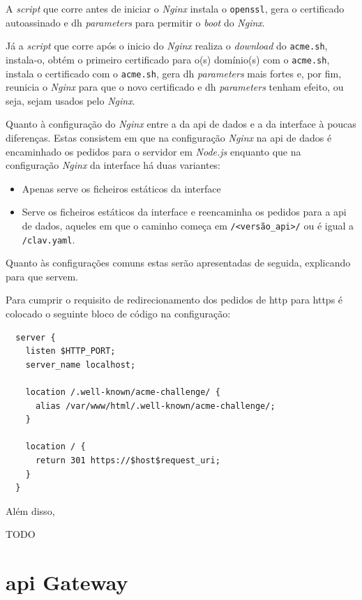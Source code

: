 A \textit{script} que corre antes de iniciar o \textit{Nginx} instala o \texttt{openssl}, gera o certificado autoassinado e \acrshort{dh} \textit{parameters} para permitir o \textit{boot} do \textit{Nginx}.

Já a \textit{script} que corre após o inicio do \textit{Nginx} realiza o \textit{download} do \texttt{acme.sh}, instala-o, obtém o primeiro certificado para o(s) domínio(s) com o \texttt{acme.sh}, instala o certificado com o \texttt{acme.sh}, gera \acrshort{dh} \textit{parameters} mais fortes e, por fim, reunicia o \textit{Nginx} para que o novo certificado e \acrshort{dh} \textit{parameters} tenham efeito, ou seja, sejam usados pelo \textit{Nginx}.

Quanto à configuração do \textit{Nginx} entre a da \acrshort{api} de dados e a da interface à poucas diferenças. Estas consistem em que na configuração \textit{Nginx} na \acrshort{api} de dados é encaminhado os pedidos para o servidor em \textit{Node.js} enquanto que na configuração \textit{Nginx} da interface há duas variantes:
\begin{itemize}
    \item Apenas serve os ficheiros estáticos da interface
    \item Serve os ficheiros estáticos da interface e reencaminha os pedidos para a \acrshort{api} de dados, aqueles em que o caminho começa em \texttt{/<versão\_api>/} ou é igual a \texttt{/clav.yaml}.
\end{itemize}

Quanto às configurações comuns estas serão apresentadas de seguida, explicando para que servem.

Para cumprir o requisito de redirecionamento dos pedidos de \acrshort{http} para \acrshort{https} é colocado o seguinte bloco de código na configuração:
\begin{lstlisting}
  server {
    listen $HTTP_PORT;
    server_name localhost;

    location /.well-known/acme-challenge/ {
      alias /var/www/html/.well-known/acme-challenge/;
    }

    location / {
      return 301 https://$host$request_uri;
    }
  }
\end{lstlisting}
Além disso,

TODO

\section{\acrshort{api} Gateway}

